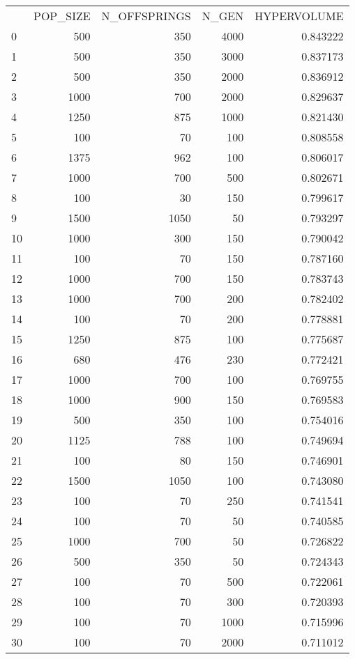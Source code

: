 \begin{tabular}{lrrrr}
 & POP_SIZE & N_OFFSPRINGS & N_GEN & HYPERVOLUME \\
0 & 500 & 350 & 4000 & 0.843222 \\
1 & 500 & 350 & 3000 & 0.837173 \\
2 & 500 & 350 & 2000 & 0.836912 \\
3 & 1000 & 700 & 2000 & 0.829637 \\
4 & 1250 & 875 & 1000 & 0.821430 \\
5 & 100 & 70 & 100 & 0.808558 \\
6 & 1375 & 962 & 100 & 0.806017 \\
7 & 1000 & 700 & 500 & 0.802671 \\
8 & 100 & 30 & 150 & 0.799617 \\
9 & 1500 & 1050 & 50 & 0.793297 \\
10 & 1000 & 300 & 150 & 0.790042 \\
11 & 100 & 70 & 150 & 0.787160 \\
12 & 1000 & 700 & 150 & 0.783743 \\
13 & 1000 & 700 & 200 & 0.782402 \\
14 & 100 & 70 & 200 & 0.778881 \\
15 & 1250 & 875 & 100 & 0.775687 \\
16 & 680 & 476 & 230 & 0.772421 \\
17 & 1000 & 700 & 100 & 0.769755 \\
18 & 1000 & 900 & 150 & 0.769583 \\
19 & 500 & 350 & 100 & 0.754016 \\
20 & 1125 & 788 & 100 & 0.749694 \\
21 & 100 & 80 & 150 & 0.746901 \\
22 & 1500 & 1050 & 100 & 0.743080 \\
23 & 100 & 70 & 250 & 0.741541 \\
24 & 100 & 70 & 50 & 0.740585 \\
25 & 1000 & 700 & 50 & 0.726822 \\
26 & 500 & 350 & 50 & 0.724343 \\
27 & 100 & 70 & 500 & 0.722061 \\
28 & 100 & 70 & 300 & 0.720393 \\
29 & 100 & 70 & 1000 & 0.715996 \\
30 & 100 & 70 & 2000 & 0.711012 \\
\end{tabular}
